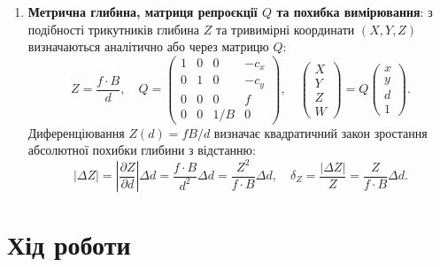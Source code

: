 \documentclass[14pt, a4paper]{extarticle}
\begin{document}
\begin{enumerate}
    \item \textbf{Метрична глибина, матриця репроєкції $Q$ та похибка вимірювання}: з подібності трикутників глибина $Z$ та тривимірні координати $(X, Y, Z)$ визначаються аналітично або через матрицю $Q$:
    \begin{equation}\label{eq:depth_q}
        Z = \frac{f \cdot B}{d}, \quad
        Q = \begin{pmatrix} 1 & 0 & 0 & -c_x \\ 0 & 1 & 0 & -c_y \\ 0 & 0 & 0 & f \\ 0 & 0 & 1/B & 0 \end{pmatrix}, \quad
        \begin{pmatrix} X \\ Y \\ Z \\ W \end{pmatrix} = Q \begin{pmatrix} x \\ y \\ d \\ 1 \end{pmatrix}.
    \end{equation}
    Диференціювання $Z(d) = fB / d$ визначає квадратичний закон зростання абсолютної похибки глибини з відстанню:
    \begin{equation}\label{eq:depth_error}
        \left| \Delta Z \right| = \left| \frac{\partial Z}{\partial d} \right| \Delta d = \frac{f \cdot B}{d^2} \Delta d = \frac{Z^2}{f \cdot B} \Delta d, \quad \delta_Z = \frac{|\Delta Z|}{Z} = \frac{Z}{f \cdot B} \Delta d.
    \end{equation}
\end{enumerate}

\section{Хід роботи}
\end{document}
